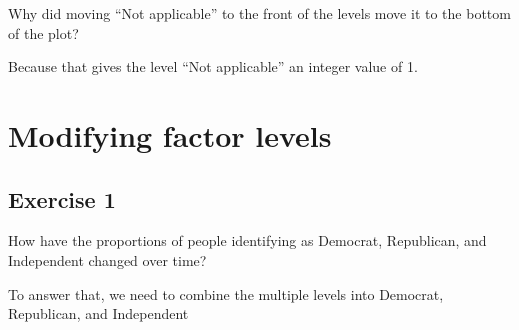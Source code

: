 \documentclass[]{book}
\newenvironment{Shaded}{\begin{snugshade}}{\end{snugshade}}
\newcommand{\CommentTok}[1]{\textcolor[rgb]{0.56,0.35,0.01}{\textit{#1}}}
\newcommand{\KeywordTok}[1]{\textcolor[rgb]{0.13,0.29,0.53}{\textbf{#1}}}
\newcommand{\NormalTok}[1]{#1}
\newcommand{\OperatorTok}[1]{\textcolor[rgb]{0.81,0.36,0.00}{\textbf{#1}}}
\theoremstyle{definition}
\theoremstyle{definition}
\theoremstyle{definition}
\theoremstyle{remark}
\begin{document}
Why did moving ``Not applicable'' to the front of the levels move it to
the bottom of the plot?

Because that gives the level ``Not applicable'' an integer value of 1.

\hypertarget{modifying-factor-levels}{%
\section{Modifying factor levels}\label{modifying-factor-levels}}

\hypertarget{exercise-1-40}{%
\subsection{Exercise 1}\label{exercise-1-40}}

How have the proportions of people identifying as Democrat, Republican,
and Independent changed over time?

To answer that, we need to combine the multiple levels into Democrat,
Republican, and Independent

\begin{Shaded}
\end{Shaded}
\end{document}
